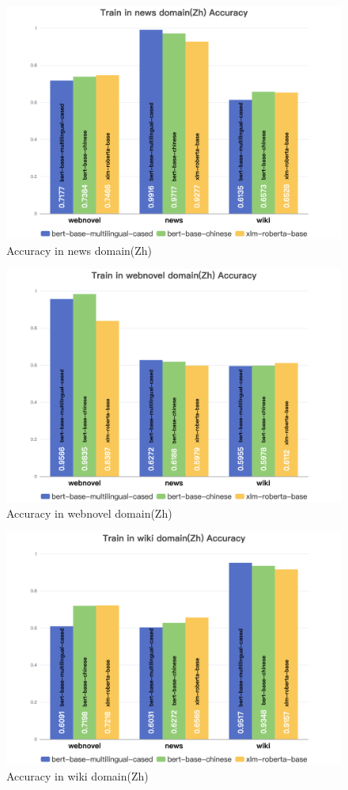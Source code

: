 \documentclass[lettersize,journal]{IEEEtran}
\begin{document}
\begin{figure}[H]
    \centering
    \includegraphics[width=0.8\linewidth]{images/Train in news domain(Zh) Accuracy.png}
    \caption{Accuracy in news domain(Zh)}
    \end{figure}


 \begin{figure}[H]
    \centering
    \includegraphics[width=0.8\linewidth]{images/Train in webnovel domain(Zh) Accuracy.png}
    \caption{Accuracy in webnovel domain(Zh)}
    \end{figure}

 
 \begin{figure}[H]
    \centering
    \includegraphics[width=0.8\linewidth]{images/Train in wiki domain(Zh) Accuracy.png}
    \caption{Accuracy in wiki domain(Zh)}
    \end{figure}
\end{document}
